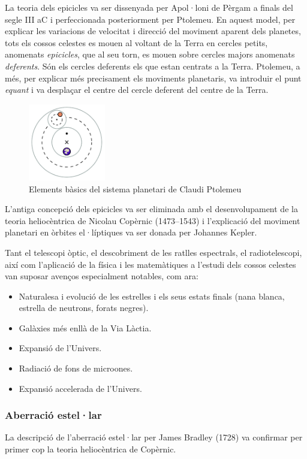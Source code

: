 La teoria dels epicicles va ser dissenyada per Apol·loni de Pèrgam a finals del segle III aC i perfeccionada posteriorment per Ptolemeu. En aquest model, per explicar les variacions de velocitat i direcció del moviment aparent dels planetes, tots els cossos celestes es mouen al voltant de la Terra en cercles petits, anomenats \textit{epicicles}, que al seu torn, es mouen sobre cercles majors anomenats \textit{deferents}. Són els cercles deferents els que estan centrats a la Terra. Ptolemeu, a més, per explicar més precisament els moviments planetaris, va introduir el punt \textit{equant} i va desplaçar el centre del cercle deferent del centre de la Terra.
\begin{figure}[H]
	\centering
	\includegraphics[width=0.3\textwidth]{./images/1-epicycles-b}
	\caption{Elements bàsics del sistema planetari de Claudi Ptolemeu}
	\label{fig:epicycles-b}
\end{figure}

L'antiga concepció dels epicicles va ser eliminada amb el desenvolupament de la teoria heliocèntrica de Nicolau Copèrnic (1473--1543) i l'explicació del moviment planetari en òrbites el·líptiques va ser donada per Johannes Kepler.

Tant el telescopi òptic, el descobriment de les ratlles espectrals, el radiotelescopi, així com l'aplicació de la física i les matemàtiques a l'estudi dels cossos celestes van suposar avenços especialment notables, com ara:
\begin{itemize}
	\item Naturalesa i evolució de les estrelles i els seus estats finals (nana blanca, estrella de neutrons, forats negres).
	\item Galàxies més enllà de la Via Làctia.
	\item Expansió de l'Univers.
	\item Radiació de fons de microones.
	\item Expansió accelerada de l'Univers.
\end{itemize}

\subsubsection*{Aberració estel·lar}
La descripció de l'aberració estel·lar per James Bradley (1728) va confirmar per primer cop la teoria heliocèntrica de Copèrnic.

